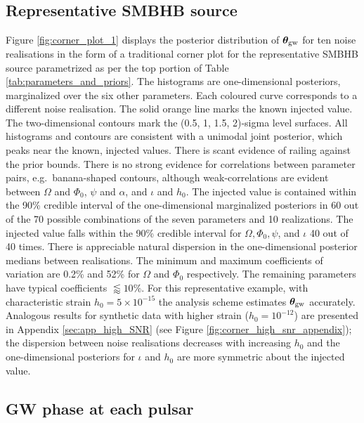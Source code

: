 \documentclass[fleqn,usenatbib,useAMS]{mnras}
\begin{document}
\subsection{Representative SMBHB source}\label{sec:rep_smbh_source}

Figure \ref{fig:corner_plot_1} displays the posterior distribution of $\boldsymbol{\theta}_{\rm gw}$ for ten noise realisations in the form of a traditional corner plot for the representative SMBHB source parametrized as per the top portion of Table \ref{tab:parameters_and_priors}. The histograms are one-dimensional posteriors, marginalized over the six other parameters. Each coloured curve corresponds to a different noise realisation. The solid orange line marks the known injected value. The two-dimensional contours mark the (0.5, 1, 1.5, 2)-sigma level surfaces. All histograms and contours are consistent with a unimodal joint posterior, which peaks near the known, injected values. There is scant evidence of railing against the prior bounds. There is no strong evidence for correlations between parameter pairs, e.g.\ banana-shaped contours, although weak-correlations are evident between $\Omega$ and $\Phi_0$, $\psi$ and $\alpha$, and $\iota$ and $h_0$. The injected value is contained within the 90\% credible interval of the one-dimensional marginalized posteriors in 60 out of the 70 possible combinations of the seven parameters and 10 realizations. The injected value falls within the 90\% credible interval for $\Omega, \Phi_0, \psi$, and  $\iota$ 40 out of 40 times. There is appreciable natural dispersion in the one-dimensional posterior medians between realisations. The minimum and maximum coefficients of variation are 0.2\% and 52\% for $\Omega$ and $\Phi_0$ respectively. The remaining parameters have typical coefficients $\lessapprox 10 \%$. For this representative example, with characteristic strain $h_0 = 5 \times 10^{-15}$ the analysis scheme estimates $\boldsymbol{\theta}_{\rm gw}$ accurately. Analogous results for synthetic data with higher strain ($h_0 = 10^{-12}$) are presented in Appendix \ref{sec:app_high_SNR} (see Figure \ref{fig:corner_high_snr_appendix}); the dispersion between noise realisations decreases with increasing $h_0$ and the one-dimensional posteriors for $\iota$ and $h_0$ are more symmetric about the injected value. \newline 

\subsection{GW phase at each pulsar} \label{sec:chi_estim}
\end{document}
